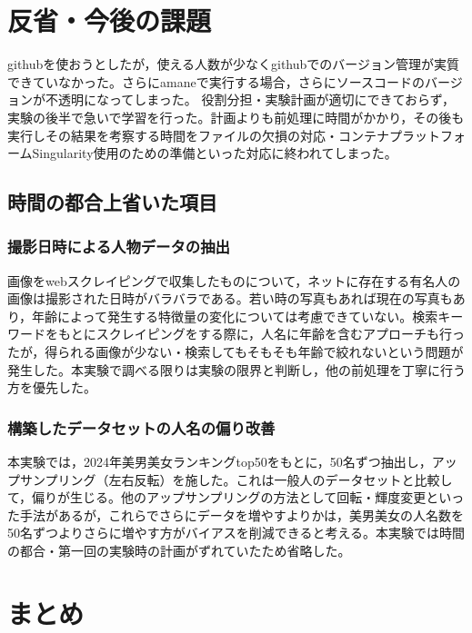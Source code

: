 \documentclass[a4paper,11pt,titlepage]{jsarticle}
\begin{document}
\section{反省・今後の課題}



githubを使おうとしたが，使える人数が少なくgithubでのバージョン管理が実質できていなかった。さらにamaneで実行する場合，さらにソースコードのバージョンが不透明になってしまった。
役割分担・実験計画が適切にできておらず，実験の後半で急いで学習を行った。計画よりも前処理に時間がかかり，その後も実行しその結果を考察する時間をファイルの欠損の対応・コンテナプラットフォームSingularity使用のための準備といった対応に終われてしまった。

\subsection{時間の都合上省いた項目}
\subsubsection{撮影日時による人物データの抽出}
画像をwebスクレイピングで収集したものについて，ネットに存在する有名人の画像は撮影された日時がバラバラである。若い時の写真もあれば現在の写真もあり，年齢によって発生する特徴量の変化については考慮できていない。検索キーワードをもとにスクレイピングをする際に，人名に年齢を含むアプローチも行ったが，得られる画像が少ない・検索してもそもそも年齢で絞れないという問題が発生した。本実験で調べる限りは実験の限界と判断し，他の前処理を丁寧に行う方を優先した。

\subsubsection{構築したデータセットの人名の偏り改善}
本実験では，2024年美男美女ランキングtop50をもとに，50名ずつ抽出し，アップサンプリング（左右反転）を施した。これは一般人のデータセットと比較して，偏りが生じる。他のアップサンプリングの方法として回転・輝度変更といった手法があるが，これらでさらにデータを増やすよりかは，美男美女の人名数を50名ずつよりさらに増やす方がバイアスを削減できると考える。本実験では時間の都合・第一回の実験時の計画がずれていたため省略した。

\section{まとめ}
\end{document}
